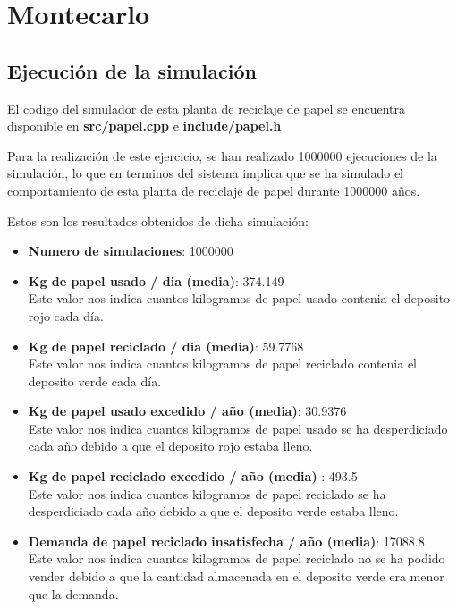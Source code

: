 \chapter{Montecarlo}

\section{Ejecución de la simulación}

El codigo del simulador de esta planta de reciclaje de papel se encuentra disponible en \textbf{src/papel.cpp} e \textbf{include/papel.h}

Para la realización de este ejercicio, se han realizado 1000000 ejecuciones de la simulación, lo que en terminos del sistema implica que se ha simulado el comportamiento de esta planta de reciclaje de papel durante 1000000 años.

Estos son los resultados obtenidos de dicha simulación:

\begin{itemize}
	\item \textbf{Numero de simulaciones}: 1000000
	\item \textbf{Kg de papel usado / dia (media)}: 374.149\\
		Este valor nos indica cuantos kilogramos de papel usado contenia el deposito rojo cada día.
	\item \textbf{Kg de papel reciclado / dia (media)}: 59.7768\\
		Este valor nos indica cuantos kilogramos de papel reciclado contenia el deposito verde cada día.
	\item \textbf{Kg de papel usado excedido / año (media)}: 30.9376\\
		Este valor nos indica cuantos kilogramos de papel usado se ha desperdiciado cada año debido a que el deposito rojo estaba lleno.
	\item \textbf{Kg de papel reciclado excedido / año (media) }: 493.5\\
		Este valor nos indica cuantos kilogramos de papel reciclado se ha desperdiciado cada año debido a que el deposito verde estaba lleno.
	\item \textbf{Demanda de papel reciclado insatisfecha / año (media)}: 17088.8\\
		Este valor nos indica cuantos kilogramos de papel reciclado no se ha podido vender debido a que la cantidad almacenada en el deposito verde era menor que la demanda.
\end{itemize}

